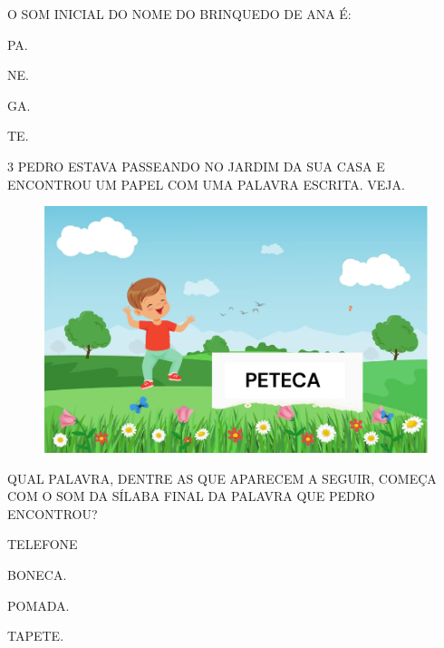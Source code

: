 O SOM INICIAL DO NOME DO BRINQUEDO DE ANA É:

\begin{escolha}
\item PA.

\item NE.

\item GA.

\item TE.
\end{escolha}


\num{3} PEDRO ESTAVA PASSEANDO NO JARDIM DA SUA CASA E ENCONTROU UM PAPEL COM UMA PALAVRA ESCRITA. VEJA.

\begin{figure}[htpb!]
\centering
\includegraphics[width=.8\textwidth]{media/image84.png}
\end{figure}


QUAL PALAVRA, DENTRE AS QUE APARECEM A SEGUIR, COMEÇA COM O SOM DA SÍLABA FINAL DA PALAVRA QUE PEDRO ENCONTROU?

\begin{escolha}
\item TELEFONE

\item BONECA.

\item POMADA.

\item TAPETE.
\end{escolha}

